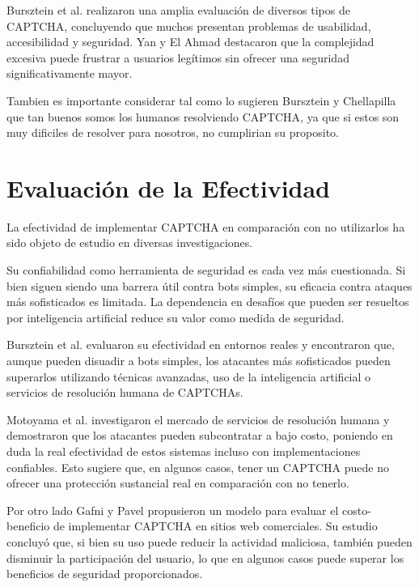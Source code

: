 \documentclass[conference]{IEEEtran}
\begin{document}
Bursztein et al. \cite{Bursztein2011} realizaron una amplia evaluación de diversos tipos de CAPTCHA, concluyendo que muchos presentan problemas de usabilidad, accesibilidad y seguridad. Yan y El Ahmad \cite{Yan2008} destacaron que la complejidad excesiva puede frustrar a usuarios legítimos sin ofrecer una seguridad significativamente mayor.

Tambien es importante considerar tal como lo sugieren Bursztein y Chellapilla que tan buenos somos los humanos resolviendo CAPTCHA, ya que si estos son muy dificiles de resolver para nosotros, no cumplirian su proposito. \cite{Bursztein2011, Chellapilla2005}

\bigskip

\section{Evaluación de la Efectividad}

La efectividad de implementar CAPTCHA en comparación con no utilizarlos ha sido objeto de estudio en diversas investigaciones.

Su confiabilidad como herramienta de seguridad es cada vez más cuestionada. Si bien siguen siendo una barrera útil contra bots simples, su eficacia contra ataques más sofisticados es limitada. La dependencia en desafíos que pueden ser resueltos por inteligencia artificial reduce su valor como medida de seguridad.

Bursztein et al. \cite{Bursztein2011} evaluaron su efectividad en entornos reales y encontraron que, aunque pueden disuadir a bots simples, los atacantes más sofisticados pueden superarlos utilizando técnicas avanzadas, uso de la inteligencia artificial o servicios de resolución humana de CAPTCHAs.

Motoyama et al. \cite{Motoyama2010} investigaron el mercado de servicios de resolución humana y demostraron que los atacantes pueden subcontratar a bajo costo, poniendo en duda la real efectividad de estos sistemas incluso con implementaciones confiables. Esto sugiere que, en algunos casos, tener un CAPTCHA puede no ofrecer una protección sustancial real en comparación con no tenerlo.

Por otro lado Gafni y Pavel \cite{Gafni2019} propusieron un modelo para evaluar el costo-beneficio de implementar CAPTCHA en sitios web comerciales. Su estudio concluyó que, si bien su uso puede reducir la actividad maliciosa, también pueden disminuir la participación del usuario, lo que en algunos casos puede superar los beneficios de seguridad proporcionados.
\end{document}
